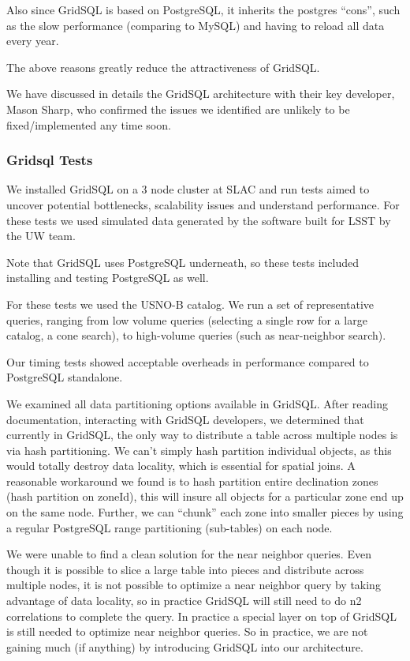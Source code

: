 \documentclass[DM,lsstdraft,toc]{lsstdoc}
\begin{document}
Also since GridSQL is based on PostgreSQL, it inherits the postgres
``cons'', such as the slow performance (comparing to MySQL) and having
to reload all data every year.

The above reasons greatly reduce the attractiveness of GridSQL.

We have discussed in details the GridSQL architecture with their key
developer, Mason Sharp, who confirmed the issues we identified are
unlikely to be fixed/implemented any time soon.

\subsubsection{Gridsql Tests}\label{gridsql-tests}

We installed GridSQL on a 3 node cluster at SLAC and run tests aimed to
uncover potential bottlenecks, scalability issues and understand
performance. For these tests we used simulated data generated by the
software built for LSST by the UW team.

Note that GridSQL uses PostgreSQL underneath, so these tests included
installing and testing PostgreSQL as well.

For these tests we used the USNO-B catalog. We run a set of
representative queries, ranging from low volume queries (selecting a
single row for a large catalog, a cone search), to high-volume queries
(such as near-neighbor search).

Our timing tests showed acceptable overheads in performance compared to
PostgreSQL standalone.

We examined all data partitioning options available in GridSQL. After
reading documentation, interacting with GridSQL developers, we
determined that currently in GridSQL, the only way to distribute a table
across multiple nodes is via hash partitioning. We can't simply hash
partition individual objects, as this would totally destroy data
locality, which is essential for spatial joins. A reasonable workaround
we found is to hash partition entire declination zones (hash partition
on zoneId), this will insure all objects for a particular zone end up on
the same node. Further, we can ``chunk'' each zone into smaller pieces
by using a regular PostgreSQL range partitioning (sub-tables) on each
node.

We were unable to find a clean solution for the near neighbor queries.
Even though it is possible to slice a large table into pieces and
distribute across multiple nodes, it is not possible to optimize a near
neighbor query by taking advantage of data locality, so in practice
GridSQL will still need to do n2 correlations to complete the query. In
practice a special layer on top of GridSQL is still needed to optimize
near neighbor queries. So in practice, we are not gaining much (if
anything) by introducing GridSQL into our architecture.
\end{document}
